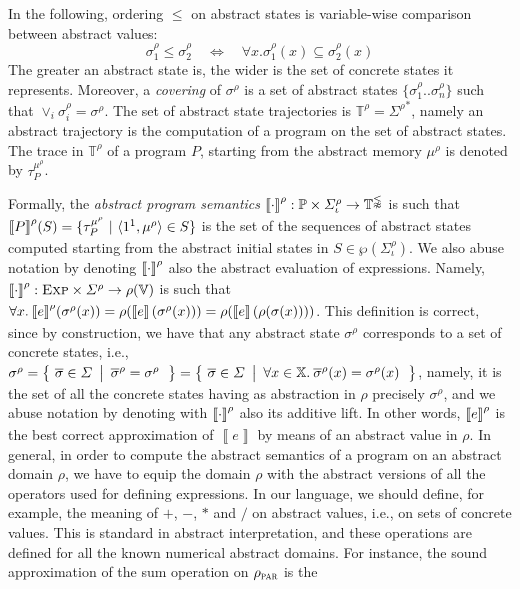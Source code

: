 \documentclass[prodmode,acmtocl]{acmsmall}
\def\prog{\ensuremath{P}\xspace}
\def\progs{\ensuremath{\mathbb{P}}\xspace}
\def\state{\ensuremath{\sigma}\xspace}
\def\states{\ensuremath{\Sigma}\xspace}
\def\trace{\ensuremath{\tau}\xspace}
\def\atraces{\ensuremath{\mathbb{T^\rho}}\xspace}
\def\variables{\ensuremath{\mathbb{X}}\xspace}
\def\values{\ensuremath{\mathbb{V}}\xspace}
\def\abmemory{\ensuremath{\mu^\rho}\xspace}
\def\uco{\ensuremath{\rho}\xspace}
\def\astate{{\sigma^\rho}\xspace}
\def\astates{{\Sigma^\rho}\xspace}
\def\iastates{{\Sigma_\iota^\rho}\xspace}
\newcommand{\ra}{\rightarrow}
\newcommand{\ov}{\overline}
\def\ok#1{\mbox{\raisebox{0ex}[1ex][1ex]{$#1$}}}
\newcommand{\sset}[2]{\left\{~#1 ~ \left |
                               \begin{array}{l}#2\end{array}
                          \right.     \right\}}
\def\tuple#1{\langle #1 \rangle}
\newcommand{\0}{\mbox{\bf 0}}
\def\ok#1{\mbox{\raisebox{0ex}[1ex][1ex]{$#1$}}}
\newcommand{\UNARYFUNCTION}[2]{#1\ifthenelse{\equal{#2}{}}{}{\left(#2\right)}}
\newcommand{\SEMANTICS}[1]{\left\llbracket #1 \right\rrbracket}
\def\IMPEXP{{\mbox{\sc Exp}}}
\def\exp{e}
\def\PARDOM{\ensuremath{\uco_{\textsc{par}}}\xspace}
\newcommand{\ABSEVAL}[2]{\ok{\UNARYFUNCTION{\SEMANTICS{#1}^\rho}{#2}}}
\begin{document}
In the following, ordering $\leq$ on abstract states is variable-wise
comparison between abstract values:
\[ \state^\uco_1 \leq \state^\uco_2 \quad \Leftrightarrow \quad \forall
x. \state^\uco_1(x) \subseteq \state^\uco_2(x) \] The greater an
abstract state is, the wider is the set of concrete states it
represents.  Moreover, a \emph{covering} of $\astate$ is a set of
abstract states $\{ \state^\uco_1..\state^\uco_n \}$ such that $\vee_i
\state^\uco_i = \astate$.  The set of abstract state trajectories is
$\atraces=\astates^*$, namely an abstract trajectory is the
computation of a program on the set of abstract states. The trace in
$\atraces$ of a program $\prog$, starting from the abstract memory
$\abmemory$ is denoted by $\trace^{\abmemory}_\prog$.

Formally, the \emph{abstract program semantics}
$\ABSEVAL{\cdot}{}:\progs\times\iastates\ra\atraces$ is such that
$\ok{\ABSEVAL{\prog}{}(S)=\{\trace^{\abmemory}_\prog~|~\tuple{1^1,\abmemory}\in
  S\}}$ is the set of the sequences of abstract states computed
starting from the abstract initial states in $S\in\wp(\iastates)$.  We
also abuse notation by denoting $\ABSEVAL{\cdot}{}$ also the abstract
evaluation of expressions. Namely,
$\ok{\ABSEVAL{\cdot}{}:\IMPEXP\times\astates\ra\uco(\values)}$ is such
that $\forall
x.\:\ABSEVAL{\exp}{}(\astate(x))=\uco(\SEMANTICS{\exp}(\astate(x)))=\uco(\SEMANTICS{\exp}(\uco(\state(x))))$. This
definition is correct, since by construction, we have that any
abstract state $\astate$ corresponds to a set of concrete states,
i.e.,
$\ok{\astate=\sset{\ov{\state}\in\states}{\ov{\state}^\uco=\astate}}=\ok{\sset{\ov{\state}\in\states}{\forall
    x\in\variables.\:\ov{\state}^\uco(x)=\astate(x)}}$,
namely, it is the set of all the concrete states having as abstraction
in $\uco$ precisely $\astate$, and we abuse notation by denoting with
$\ABSEVAL{\cdot}{}$ also its additive lift.  In other words,
$\ABSEVAL{\exp}{}$ is the best correct approximation of
$\SEMANTICS{\exp}$ by means of an abstract value in $\uco$.
In general, in order to compute the abstract semantics of a program on
an abstract domain $\uco$, we have to equip the domain $\uco$ with the
abstract versions of all the operators used for defining expressions.
In our language, we should define, for example, the meaning of $+$,
$-$, $*$ and $/$ on abstract values, i.e., on sets of concrete values.
This is standard in abstract interpretation, and these operations are
defined for all the known numerical abstract domains.  For instance,
the sound approximation of the sum operation on $\PARDOM$ is the
\end{document}
